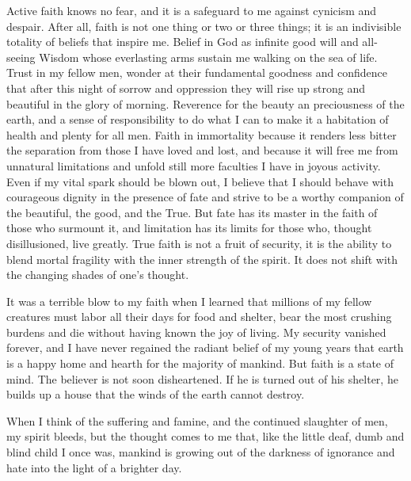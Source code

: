 \documentclass[11pt,twoside,openany,x11names,svgnames]{memoir}
\begin{document}
Active faith knows no fear, and it is a safeguard to me against cynicism and despair. After all, faith is not one thing or two or three things; it is an indivisible totality of beliefs that inspire me. Belief in God as infinite good will and all-seeing Wisdom whose everlasting arms sustain me walking on the sea of life. Trust in my fellow men, wonder at their fundamental goodness and confidence that after this night of sorrow and oppression they will rise up strong and beautiful in the glory of morning. Reverence for the beauty an preciousness of the earth, and a sense of responsibility to do what I can to make it a habitation of health and plenty for all men. Faith in immortality because it renders less bitter the separation from those I have loved and lost, and because it will free me from unnatural limitations and unfold still more faculties I have in joyous activity. Even if my vital spark should be blown out, I believe that I should behave with courageous dignity in the presence of fate and strive to be a worthy companion of the beautiful, the good, and the True. But fate has its master in the faith of those who surmount it, and limitation has its limits for those who, thought disillusioned, live greatly. True faith is not a fruit of security, it is the ability to blend mortal fragility with the inner strength of the spirit. It does not shift with the changing shades of one's thought.

It was a terrible blow to my faith when I learned that millions of my fellow creatures must labor all their days for food and shelter, bear the most crushing burdens and die without having known the joy of living. My security vanished forever, and I have never regained the radiant belief of my young years that earth is a happy home and hearth for the majority of mankind. But faith is a state of mind. The believer is not soon disheartened. If he is turned out of his shelter, he builds up a house that the winds of the earth cannot destroy.

When I think of the suffering and famine, and the continued slaughter of men, my spirit bleeds, but the thought comes to me that, like the little deaf, dumb and blind child I once was, mankind is growing out of the darkness of ignorance and hate into the light of a brighter day.
\cleartoverso




\enlargethispage{3\baselineskip}
\thispagestyle{empty}
\pagecolor[HTML]{0E0407}
\end{document}
